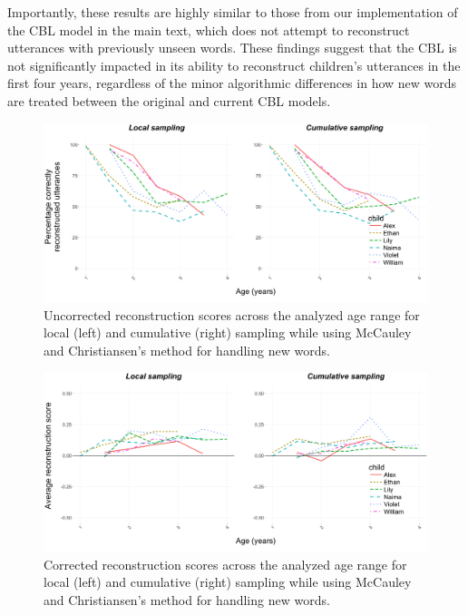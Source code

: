 \documentclass[man,mask,floatsintext]{apa6}
\begin{document}
Importantly, these results are highly similar to those from our
implementation of the CBL model in the main text, which does not attempt
to reconstruct utterances with previously unseen words. These findings
suggest that the CBL is not significantly impacted in its ability to
reconstruct children's utterances in the first four years, regardless of
the minor algorithmic differences in how new words are treated between
the original and current CBL models.

\begin{figure}

{\centering \includegraphics[width=0.95\linewidth]{images/suppl_bothreconperc} 

}

\caption{Uncorrected reconstruction scores across the analyzed age range for local (left) and cumulative (right) sampling while using McCauley and Christiansen's method for handling new words.}\label{fig:smfig1}
\end{figure}

\begin{figure}

{\centering \includegraphics[width=0.95\linewidth]{images/suppl_bothreconscore} 

}

\caption{Corrected reconstruction scores across the analyzed age range for local (left) and cumulative (right) sampling while using McCauley and Christiansen's method for handling new words.}\label{fig:smfig2}
\end{figure}
\end{document}
